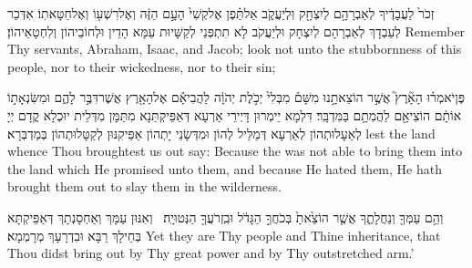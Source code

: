 {זְכֹר֙ לַעֲבָדֶ֔יךָ לְאַבְרָהָ֥ם לְיִצְחָ֖ק וּֽלְיַעֲקֹ֑ב אַל\maqqaf תֵּ֗פֶן אֶל\maqqaf קְשִׁי֙ הָעָ֣ם הַזֶּ֔ה וְאֶל\maqqaf רִשְׁע֖וֹ וְאֶל\maqqaf חַטָּאתֽוֹ׃}
{אִדְּכַר לְעַבְדָךְ לְאַבְרָהָם לְיִצְחָק וּלְיַעֲקֹב לָא תִתְפְּנֵי לְקַשָּׁיוּת עַמָּא הָדֵין וּלְחוֹבֵיהוֹן וְלִחְטָאֵיהוֹן׃}
{Remember Thy servants, Abraham, Isaac, and Jacob; look not unto the stubbornness of this people, nor to their wickedness, nor to their sin;}{}

{פֶּן\maqqaf יֹאמְר֗וּ הָאָ֘רֶץ֮ אֲשֶׁ֣ר הוֹצֵאתָ֣נוּ מִשָּׁם֒ מִבְּלִי֙ יְכֹ֣לֶת יְהֹוָ֔ה לַהֲבִיאָ֕ם אֶל\maqqaf הָאָ֖רֶץ אֲשֶׁר\maqqaf דִּבֶּ֣ר לָהֶ֑ם וּמִשִּׂנְאָת֣וֹ אוֹתָ֔ם הוֹצִיאָ֖ם לַהֲמִתָ֥ם בַּמִּדְבָּֽר׃}
{דִּלְמָא יֵימְרוּן דָּיְירֵי אַרְעָא דְּאַפֵּיקְתַּנָא מִתַּמָּן מִדְּלֵית יוּכְלָא קֳדָם יְיָ לְאַעָלוּתְהוֹן לְאַרְעָא דְּמַלֵּיל לְהוֹן וּמִדְּשָׂנֵי יָתְהוֹן אַפֵּיקִנּוּן לְקַטָּלוּתְהוֹן בְּמַדְבְּרָא׃}
{lest the land whence Thou broughtest us out say: Because the \lord\space was not able to bring them into the land which He promised unto them, and because He hated them, He hath brought them out to slay them in the wilderness.}{}

{וְהֵ֥ם עַמְּךָ֖ וְנַחֲלָתֶ֑ךָ אֲשֶׁ֤ר הוֹצֵ֙אתָ֙ בְּכֹחֲךָ֣ הַגָּדֹ֔ל וּבִֽזְרֹעֲךָ֖ הַנְּטוּיָֽה׃ \petucha }
{וְאִנּוּן עַמָּךְ וְאַחְסָנְתָךְ דְּאַפֵּיקְתָּא בְּחֵילָךְ רַבָּא וּבִדְרָעָךְ מְרָמְמָא׃}
{Yet they are Thy people and Thine inheritance, that Thou didst bring out by Thy great power and by Thy outstretched arm.’}{}

